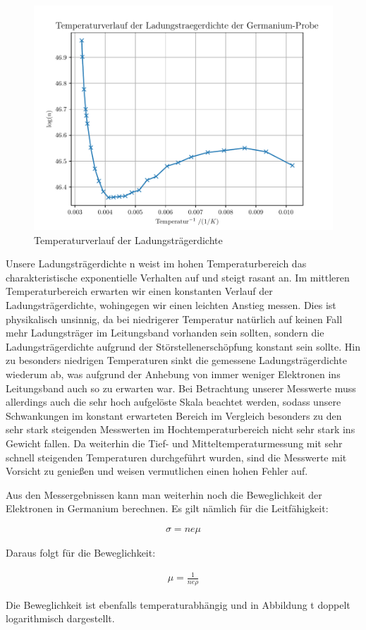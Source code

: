 \begin{figure}[htbp] 
     \includegraphics[scale=0.7]{temp_n.pdf}
  \caption{Temperaturverlauf der Ladungsträgerdichte}
  \label{n}
\end{figure}


Unsere Ladungsträgerdichte n weist im hohen Temperaturbereich das charakteristische exponentielle Verhalten auf und steigt rasant an. Im mittleren Temperaturbereich erwarten wir einen konstanten Verlauf der Ladungsträgerdichte, wohingegen wir einen leichten Anstieg messen. Dies ist physikalisch unsinnig, da bei niedrigerer Temperatur natürlich auf keinen Fall mehr Ladungsträger im Leitungsband vorhanden sein sollten, sondern die Ladungsträgerdichte aufgrund der Störstellenerschöpfung konstant sein sollte. Hin zu besonders niedrigen Temperaturen sinkt die gemessene Ladungsträgerdichte wiederum ab, was aufgrund der Anhebung von immer weniger Elektronen ins Leitungsband auch so zu erwarten war. 
Bei Betrachtung unserer Messwerte muss allerdings auch die sehr hoch aufgelöste Skala beachtet werden, sodass unsere Schwankungen im konstant erwarteten Bereich im Vergleich besonders zu den sehr stark steigenden Messwerten im Hochtemperaturbereich nicht sehr stark ins Gewicht fallen. Da weiterhin die Tief- und Mitteltemperaturmessung mit sehr schnell steigenden Temperaturen durchgeführt wurden, sind die Messwerte mit Vorsicht zu genießen und weisen vermutlichen einen hohen Fehler auf.


Aus den Messergebnissen kann man weiterhin noch die Beweglichkeit der Elektronen in Germanium berechnen. Es gilt nämlich für die Leitfähigkeit:

\begin{align}
\sigma=ne\mu
\end{align}

Daraus folgt für die Beweglichkeit:

\begin{align}
\mu=\frac{1}{ne\rho}
\end{align}

Die Beweglichkeit ist ebenfalls temperaturabhängig und in Abbildung t doppelt logarithmisch dargestellt.